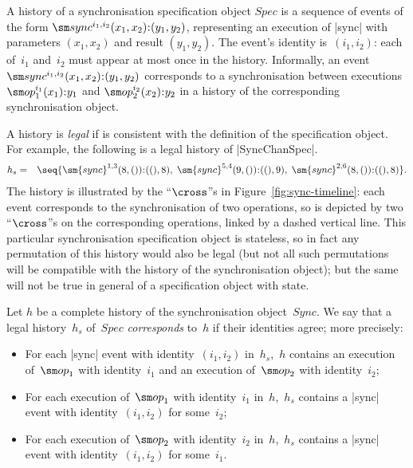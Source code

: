 A history of a synchronisation specification object $Spec$ is a sequence of
events of the form $\sync^{i_1, i_2}(x_1, x_2)\:: (y_1, y_2)$, representing an
execution of |sync| with parameters $(x_1, x_2)$ and result $(y_1,y_2)$.  The
event's  identity is~$(i_1,i_2)$: each of~$i_1$ and~$i_2$ must
appear at most once in the history.  Informally, an event $\sync^{i_1,
  i_2}(x_1, x_2)\:: (y_1, y_2)$ corresponds to a synchronisation between
executions $\op_1^{i_1}(x_1)\::y_1$ and $\op_2^{i_2}(x_2)\::y_2$ in a history
of the corresponding synchronisation object.

A history is \emph{legal} if is consistent with the definition of the
specification object.
%
For example, the following is a legal history of |SyncChanSpec|.
\begin{eqnarray*}
h_s & = & 
\seq{
 \sm{sync}^{1,3}(8,()) \:: ((), 8), \;
 \sm{sync}^{5,4}(9,()) \:: ((), 9), \;
 \sm{sync}^{2,6}(8,()) \:: ((), 8) } .
\end{eqnarray*}
The history is illustrated by the ``$\cross$''s in
Figure~\ref{fig:sync-timeline}: each event corresponds to the synchronisation
of two operations, so is depicted by two ``$\cross$''s on the corresponding
operations, linked by a dashed vertical line.  This particular synchronisation
specification object is stateless, so in fact any permutation of this history
would also be legal (but not all such permutations will be compatible with the
history of the synchronisation object); but the same will not be true in
general of a specification object with state.
%
\begin{definition}
Let $h$ be a complete history of the synchronisation object~$Sync$.  We say
that a legal history~$h_s$ of~$Spec$ \emph{corresponds} to~$h$ if their
identities agree; more precisely:
%
\begin{itemize}
\item For each |sync| event with identity~$(i_1,i_2)$ in~$h_s$,\, $h$ contains
  an execution of~$\op_1$ with identity~$i_1$ and an execution of~$\op_2$ with
  identity~$i_2$;

\item For each execution of~$\op_1$ with identity~$i_1$ in~$h$,\, $h_s$
  contains a |sync| event with identity~$(i_1,i_2)$ for some~$i_2$;

\item For each execution of~$\op_2$ with identity~$i_2$ in~$h$,\, $h_s$
  contains a |sync| event with identity~$(i_1,i_2)$ for some~$i_1$.
\end{itemize}
\end{definition}

